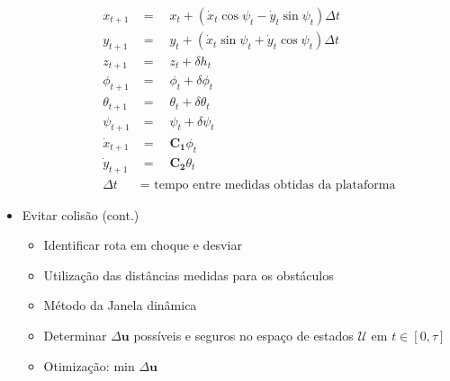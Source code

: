 \documentclass{beamer}
\begin{document}
\begin{frame}[allowframebreaks]
\begin{itemize}
\begin{itemize}
		\begin{equation}
		\begin{aligned}
		{ x }_{ t+1 } &=\quad { x }_{ t }+({ \dot { x }  }_{ t }{ \cos { \psi  }  }_{ t }-{ \dot { y }  }_{ t }{ \sin { \psi  }  }_{ t })\Delta t \\
		{ y }_{ t+1 } &=\quad y_{ t }+({ \dot { x }  }_{ t }{ \sin { \psi  }  }_{ t }+{ \dot { y }  }_{ t }{ \cos { \psi  }  }_{ t })\Delta t \\
		{ z }_{ t+1 } &=\quad { z }_{ t }+\delta { h }_{ t }\quad \\
		{ \phi  }_{ t+1 } &=\quad { \phi  }_{ t }+\delta { \phi  }_{ t }\quad \\
		{ \theta  }_{ t+1 } &=\quad { \theta  }_{ t }+\delta { \theta  }_{ t } \\
		{ \psi  }_{ t+1 } &=\quad \psi _{ t }+\delta { \psi  }_{ t } \\
		{ \dot { x }  }_{ t+1 } &=\quad \mathbf{{ C }_{ 1 }}{ \phi  }_{ t } \\
		{ \dot { y }  }_{ t+1 } &=\quad \mathbf{{ C }_{ 2 }}{ \theta  }_{ t } \\
		  \Delta t &= \mbox{ tempo entre medidas obtidas da plataforma}
		\end{aligned}
		\label{eq:equacaoProb}
		\end{equation}
		
	\end{itemize}	
	
	\framebreak
	
	\item Evitar colisão (cont.)
	
	\begin{itemize}
		
		\item Identificar rota em choque e desviar
		
		\item Utilização das distâncias medidas para os obstáculos
		
		\item Método da Janela dinâmica \cite{Saranrittichai2013}	
		
		
		\item Determinar $\Delta\mathbf{u}$  possíveis e seguros no espaço de estados $\mathcal{U}$ em $t \in [0,\tau]$
		
		\item Otimização: $\text{min } \Delta\mathbf{u}$
			
		
		
	\end{itemize}	
	

\end{itemize}
\end{frame}
\end{document}
